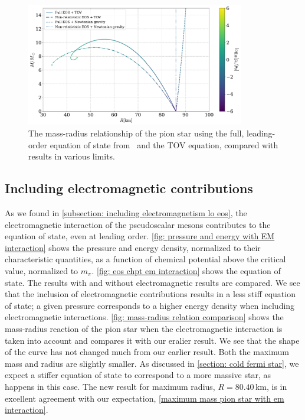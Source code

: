\begin{figure}[!htb]
    \centering
    \includegraphics[width=0.85\textwidth]{../scripts/figurer/pion_star/mass_radius_comparison.pdf}
    \caption{
        The mass-radius relationship of the pion star using the full, leading-order equation of state from \chpt\, and the TOV equation, compared with results in various limits.
        }
        \label{fig: mass-radius relation pion star comparison}
\end{figure}



\FloatBarrier
\subsection{Including electromagnetic contributions}

As we found in \autoref{subsection: including electromagnetism lo eos}, the electromagnetic interaction of the pseudoscalar mesons contributes to the equation of state, even at leading order.
\autoref{fig: pressure and energy with EM interaction} shows the pressure and energy density, normalized to their characteristic quantities, as a function of chemical potential above the critical value, normalized to $m_\pi$.
\autoref{fig: eos chpt em interaction} shows the equation of state.
The results with and without electromagnetic results are compared.
We see that the inclusion of electromagnetic contributions results in a less stiff equation of state; a given pressure corresponds to a higher energy density when including electromagnetic interactions.
\autoref{fig: mass-radius relation comparison} shows the mass-radius reaction of the pion star when the electromagnetic interaction is taken into account and compares it with our eralier result.
We see that the shape of the curve has not changed much from our earlier result. 
Both the maximum mass and radius are slightly smaller.
As discussed in \autoref{section: cold fermi star}, we expect a stiffer equation of state to correspond to a more massive star, as happens in this case.
The new result for maximum radius, $R = 80.40 \, \text{km}$, is in excellent agreement with our expectation, \autoref{maximum mass pion star with em interaction}.




